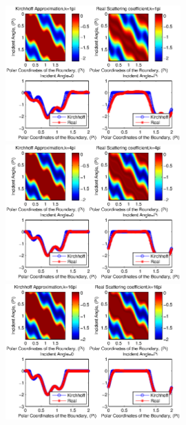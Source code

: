 \documentclass[12pt]{iopart}
\begin{document}
\begin{figure}
	\centering
	\includegraphics[width=0.6\textwidth]{./figure_sc/scattering_coefficient_pear_1.eps}
	\includegraphics[width=0.6\textwidth]{./figure_sc/scattering_coefficient_pear_4.eps}
	\includegraphics[width=0.6\textwidth]{./figure_sc/scattering_coefficient_pear_16.eps}
	\caption{}\label{pear}
\end{figure}
\end{document}
